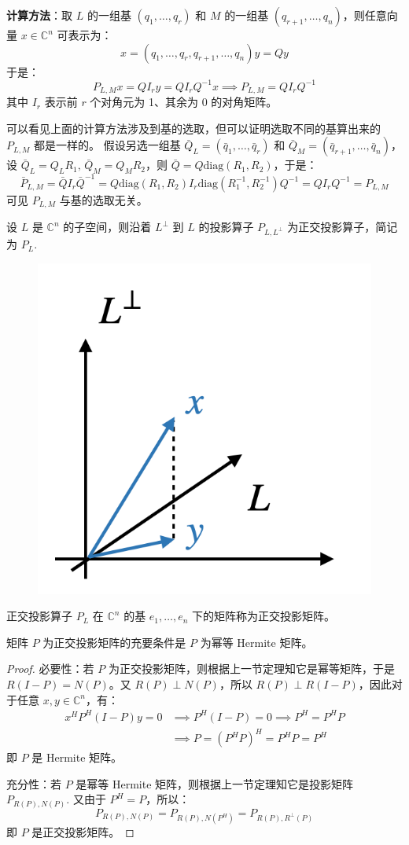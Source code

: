 \noindent\textbf{计算方法}：取 $L$ 的一组基 $(q_1,\ldots,q_r)$ 和 $M$ 的一组基 $(q_{r+1},\ldots,q_n)$，则任意向量 $x\in\mathbb C^n$ 可表示为：
\[
    x=(q_1,\ldots,q_r,q_{r+1},\ldots,q_n)y=Qy
\]
于是：
\[
    P_{L,M}x=QI_ry=QI_rQ^{-1}x\implies P_{L,M}=QI_rQ^{-1}
\]
其中 $I_r$ 表示前 $r$ 个对角元为 1、其余为 0 的对角矩阵。

\begin{com}
可以看见上面的计算方法涉及到基的选取，但可以证明选取不同的基算出来的 $P_{L,M}$ 都是一样的。
假设另选一组基 $\bar Q_L=(\bar q_1,\ldots,\bar q_r)$ 和 $\bar Q_M=(\bar q_{r+1},\ldots,\bar q_n)$，设 $\bar Q_L=Q_LR_1,\,\bar Q_M=Q_MR_2$，则 $\bar Q=Q\text{diag}(R_1,R_2)$，于是：
\[
    \bar P_{L,M}=\bar Q I_r\bar Q^{-1}=Q\text{diag}(R_1,R_2)I_r\text{diag}(R_1^{-1},R_2^{-1})Q^{-1}=QI_rQ^{-1}=P_{L,M}
\]
可见 $P_{L,M}$ 与基的选取无关。
\end{com}

\begin{definition}[正交投影算子]
设 $L$ 是 $\mathbb C^n$ 的子空间，则沿着 $L^{\perp}$ 到 $L$ 的投影算子 $P_{L,L^{\perp}}$ 为正交投影算子，简记为 $P_L$.
\begin{figure}[H]
    \centering
    \includegraphics[width=0.2\linewidth]{figs/proj-o.png}
\end{figure}
\end{definition}

\begin{definition}[正交投影矩阵]
正交投影算子 $P_{L}$ 在 $\mathbb C^n$ 的基 $e_1,\ldots,e_n$ 下的矩阵称为正交投影矩阵。
\end{definition}


\begin{theorem}
矩阵 $P$ 为正交投影矩阵的充要条件是 $P$ 为幂等 Hermite 矩阵。
\end{theorem}
\begin{proof}
必要性：若 $P$ 为正交投影矩阵，则根据上一节定理知它是幂等矩阵，于是 $R(I-P)=N(P)$。又 $R(P)\perp N(P)$，所以 $R(P)\perp R(I-P)$，因此对于任意 $x,y\in\mathbb C^n$，有：
\begin{align*}
    x^HP^H(I-P)y=0&\implies P^H(I-P)=0\implies P^H=P^HP\\&\implies P=(P^HP)^H=P^HP=P^H
\end{align*}
即 $P$ 是 Hermite 矩阵。

充分性：若 $P$ 是幂等 Hermite 矩阵，则根据上一节定理知它是投影矩阵 $P_{R(P),N(P)}$.  又由于 $P^H=P$，所以：
\[
    P_{R(P),N(P)}=P_{R(P),N(P^H)}=P_{R(P),R^\perp(P)}
\]
即 $P$ 是正交投影矩阵。
\end{proof}

